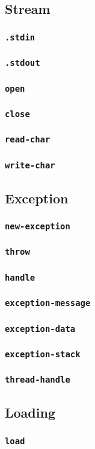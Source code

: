 \documentclass[a4paper]{article}
\newcommand{\opdef}[1]{\subsubsection{\texttt{#1}}}
\begin{document}
\subsection{Stream}
\opdef{.stdin}
\opdef{.stdout}
\opdef{open}
\opdef{close}
\opdef{read-char}
\opdef{write-char}

\subsection{Exception}
\opdef{new-exception}
\opdef{throw}
\opdef{handle}
\opdef{exception-message}
\opdef{exception-data}
\opdef{exception-stack}
\opdef{thread-handle}

\subsection{Loading}
\opdef{load}
\end{document}
